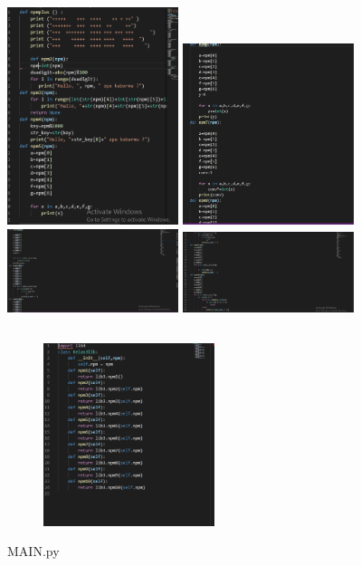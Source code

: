 \documentclass{article}
\begin{document}
\subsection{}
\begin{center}
{\includegraphics[width=5cm]{figure/K1.PNG}}
{\includegraphics[width=5cm]{figure/K2.PNG}}
{\includegraphics[width=5cm]{figure/K3.PNG}}
{\includegraphics[width=5cm]{figure/K4.PNG}}
\end{center}
\newpage\subsection{}
\begin{figure}[h]
\centerline{\includegraphics[width=5cm]{figure/J.PNG}}
\end{figure}
\par MAIN.py
\end{document}
